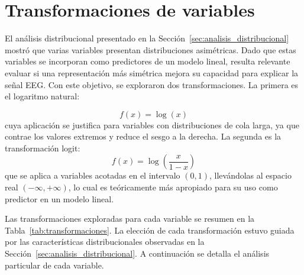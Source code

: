 \section{Transformaciones de variables}
\label{sec:transformaciones}

El análisis distribucional presentado en la Sección~\ref{sec:analisis_distribucional} 
mostró que varias variables presentan distribuciones asimétricas. Dado que estas 
variables se incorporan como predictores de un modelo lineal, resulta relevante 
evaluar si una representación más simétrica mejora su capacidad para explicar la 
señal EEG. Con este objetivo, se exploraron dos transformaciones. La primera es 
el logaritmo natural:

%
\begin{equation}
    f(x) = \log(x)
\end{equation}
%
cuya aplicación se justifica para variables con distribuciones de cola 
larga, ya que contrae los valores extremos y reduce el sesgo a la derecha. 
La segunda es la transformación logit:
%
\begin{equation}
    f(x) = \log\left(\frac{x}{1-x}\right)
\end{equation}
%
que se aplica a variables acotadas en el intervalo $(0,1)$, llevándolas 
al espacio real $(-\infty, +\infty)$, lo cual es teóricamente más apropiado 
para su uso como predictor en un modelo lineal.

Las transformaciones exploradas para cada variable se resumen en la 
Tabla~\ref{tab:transformaciones}. La elección de cada transformación 
estuvo guiada por las características distribucionales observadas en 
la Sección~\ref{sec:analisis_distribucional}. A continuación se detalla 
el análisis particular de cada variable.

